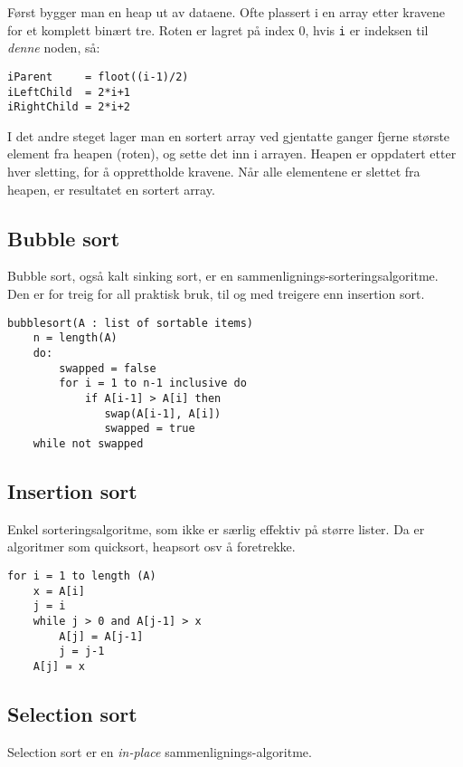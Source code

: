 \documentclass[11pt,a4paper]{article}
\theoremstyle{def}
\begin{document}
Først bygger man en heap ut av dataene. Ofte plassert i en array etter kravene for et komplett binært tre. Roten er lagret på index 0, hvis \texttt{i} er indeksen til \textit{denne} noden, så:\vspace{-10pt}
\begin{Verbatim}
iParent     = floot((i-1)/2)
iLeftChild  = 2*i+1
iRightChild = 2*i+2
\end{Verbatim}

I det andre steget lager man en sortert array ved gjentatte ganger fjerne største element fra heapen (roten), og sette det inn i arrayen. Heapen er oppdatert etter hver sletting, for å opprettholde kravene. Når alle elementene er slettet fra heapen, er resultatet en sortert array.

\subsection{Bubble sort}
Bubble sort, også kalt sinking sort, er en sammenlignings-sorteringsalgoritme. Den er for treig for all praktisk bruk, til og med treigere enn insertion sort.

\begin{Verbatim}[frame=single]
bubblesort(A : list of sortable items)
    n = length(A)
    do:
        swapped = false
        for i = 1 to n-1 inclusive do
            if A[i-1] > A[i] then
               swap(A[i-1], A[i])
               swapped = true
    while not swapped
\end{Verbatim}

\subsection{Insertion sort}
Enkel sorteringsalgoritme, som ikke er særlig effektiv på større lister. Da er algoritmer som quicksort, heapsort osv å foretrekke.

\begin{Verbatim}[frame=single]
for i = 1 to length (A)
    x = A[i]
    j = i
    while j > 0 and A[j-1] > x
        A[j] = A[j-1]
        j = j-1
    A[j] = x
\end{Verbatim}

\subsection{Selection sort}
Selection sort er en \textit{in-place} sammenlignings-algoritme.
\end{document}
